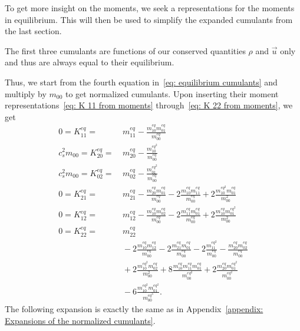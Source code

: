 
To get more insight on the moments, we seek a representations for the moments in equilibrium.
This will then be used to simplify the expanded cumulants from the last section.

The first three cumulants are functions of our conserved quantities $\rho$ and $\vec{u}$ only and thus are always equal to their equilibrium.

Thus, we start from the fourth equation in~\eqref{eq: equilibrium cumulants} and multiply by $m_{00}$ to get normalized cumulants.
Upon inserting their moment representations~\eqref{eq: K 11 from moments} through~\eqref{eq: K 22 from moments}, we get
\begin{equation}
  \begin{aligned}
    0 = K_{11}^{eq} = &\ m_{11}^{eq} - \frac{m_{10}^{eq}m_{01}^{eq}}{m_{00}^{eq}}
    \\
    c_s^2 m_{00} = K_{20}^{eq} = &\ m_{20}^{eq} - \frac{m_{10}^{{eq}^2}}{m_{00}^{eq}}
    \\
    c_s^2 m_{00} = K_{02}^{eq} = &\ m_{02}^{eq} - \frac{m_{01}^{{eq}^2}}{m_{00}^{eq}}
    \\
    0 = K_{21}^{eq} = &\ m_{21}^{eq} - \frac{m_{20}^{eq}m_{01}^{eq}}{m_{00}^{eq}} - 2\frac{m_{10}^{eq}m_{11}^{eq}} {m_{00}^{eq}} + 2\frac{m_{10}^{{eq}^2} m_{01}^{eq}}{m_{00}^2}
    \\
    0 = K_{12}^{eq} = &\ m_{12}^{eq} - \frac{m_{10}^{eq}m_{02}^{eq}}{m_{00}^{eq}}
    - 2\frac{m_{11}^{eq}m_{01}^{eq}}{m_{00}^{eq}} + 2\frac{m_{10}^{eq} m_{01}^{{eq}^2}}{m_{00}^2}
    \\
    0 = K_{22}^{eq} = &\ m_{22}^{eq}
    \\&\
    - 2 \frac{m_{10}^{eq}m_{12}^{eq}}{m_{00}^{eq}} - 2\frac{m_{21}^{eq}m_{01}^{eq}}{m_{00}^{eq}}
    - 2 \frac{m_{11}^{{eq}^2}}{m_{00}^{eq}} - \frac{m_{20}^{eq}m_{02}^{eq}}{m_{00}^{eq}}
    \\&\
    + 2 \frac{m_{10}^{{eq}^2} m_{02}^{eq}}{m_{00}^2} + 8 \frac{m_{10}^{eq}m_{11}^{eq}m_{01}^{eq}} {m_{00}^{{eq}^2}}
    + 2 \frac{m_{20}^{eq}m_{01}^{{eq}^2}}{m_{00}^{{eq}^2}}
    \\&\
    - 6 \frac{m_{10}^{{eq}^2} m_{01}^{{eq}^2}}{m_{00}^{{eq}^3}}.
  \end{aligned}
\end{equation}
The following expansion is exactly the same as in Appendix~\ref{appendix: Expansions of the normalized cumulants}.

